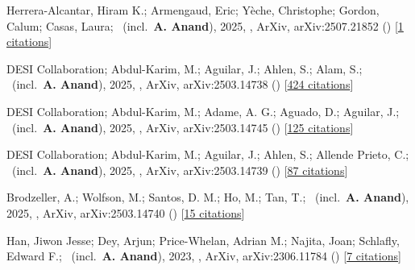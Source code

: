 \item[{\color{numcolor}\scriptsize6}] Herrera-Alcantar, Hiram K.; Armengaud, Eric; Y{\`e}che, Christophe; Gordon, Calum; Casas, Laura; \etal\ (incl.\ \textbf{A. Anand}), 2025, , ArXiv, arXiv:2507.21852 () [\href{https://ui.adsabs.harvard.edu/abs/2025arXiv250721852H}{1 citations}]

\item[{\color{numcolor}\scriptsize5}] DESI Collaboration; Abdul-Karim, M.; Aguilar, J.; Ahlen, S.; Alam, S.; \etal\ (incl.\ \textbf{A. Anand}), 2025, , ArXiv, arXiv:2503.14738 () [\href{https://ui.adsabs.harvard.edu/abs/2025arXiv250314738D}{424 citations}]

\item[{\color{numcolor}\scriptsize4}] DESI Collaboration; Abdul-Karim, M.; Adame, A. G.; Aguado, D.; Aguilar, J.; \etal\ (incl.\ \textbf{A. Anand}), 2025, , ArXiv, arXiv:2503.14745 () [\href{https://ui.adsabs.harvard.edu/abs/2025arXiv250314745D}{125 citations}]

\item[{\color{numcolor}\scriptsize3}] DESI Collaboration; Abdul-Karim, M.; Aguilar, J.; Ahlen, S.; Allende Prieto, C.; \etal\ (incl.\ \textbf{A. Anand}), 2025, , ArXiv, arXiv:2503.14739 () [\href{https://ui.adsabs.harvard.edu/abs/2025arXiv250314739D}{87 citations}]

\item[{\color{numcolor}\scriptsize2}] Brodzeller, A.; Wolfson, M.; Santos, D. M.; Ho, M.; Tan, T.; \etal\ (incl.\ \textbf{A. Anand}), 2025, , ArXiv, arXiv:2503.14740 () [\href{https://ui.adsabs.harvard.edu/abs/2025arXiv250314740B}{15 citations}]

\item[{\color{numcolor}\scriptsize1}] Han, Jiwon Jesse; Dey, Arjun; Price-Whelan, Adrian M.; Najita, Joan; Schlafly, Edward F.; \etal\ (incl.\ \textbf{A. Anand}), 2023, , ArXiv, arXiv:2306.11784 () [\href{https://ui.adsabs.harvard.edu/abs/2023arXiv230611784H}{7 citations}]